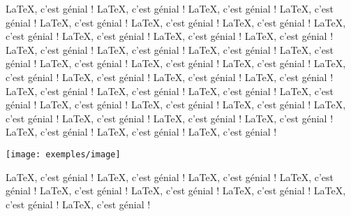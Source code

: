 \begin{minipage}{0.7\linewidth}
\LaTeX{}, c'est génial ! \LaTeX{}, c'est génial ! \LaTeX{}, c'est génial ! 
\LaTeX{}, c'est génial ! \LaTeX{}, c'est génial ! \LaTeX{}, c'est génial ! 
\LaTeX{}, c'est génial ! \LaTeX{}, c'est génial ! \LaTeX{}, c'est génial ! 
\LaTeX{}, c'est génial ! \LaTeX{}, c'est génial ! \LaTeX{}, c'est génial ! 
\LaTeX{}, c'est génial ! \LaTeX{}, c'est génial ! \LaTeX{}, c'est génial ! 
\LaTeX{}, c'est génial ! \LaTeX{}, c'est génial ! \LaTeX{}, c'est génial ! 
\LaTeX{}, c'est génial ! \LaTeX{}, c'est génial ! \LaTeX{}, c'est génial ! 
\LaTeX{}, c'est génial ! \LaTeX{}, c'est génial ! \LaTeX{}, c'est génial ! 
\LaTeX{}, c'est génial ! \LaTeX{}, c'est génial ! \LaTeX{}, c'est génial ! 
\LaTeX{}, c'est génial ! \LaTeX{}, c'est génial ! \LaTeX{}, c'est génial ! 
\LaTeX{}, c'est génial ! \LaTeX{}, c'est génial ! \LaTeX{}, c'est génial ! 
\LaTeX{}, c'est génial ! \LaTeX{}, c'est génial ! \LaTeX{}, c'est génial ! 
\end{minipage}
\hfill
\begin{minipage}{0.25\linewidth}
\texttt{[image: exemples/image]}
\end{minipage}

\medskip

\LaTeX{}, c'est génial ! \LaTeX{}, c'est génial ! \LaTeX{}, c'est génial ! 
\LaTeX{}, c'est génial ! \LaTeX{}, c'est génial ! \LaTeX{}, c'est génial ! 
\LaTeX{}, c'est génial ! \LaTeX{}, c'est génial ! \LaTeX{}, c'est génial !